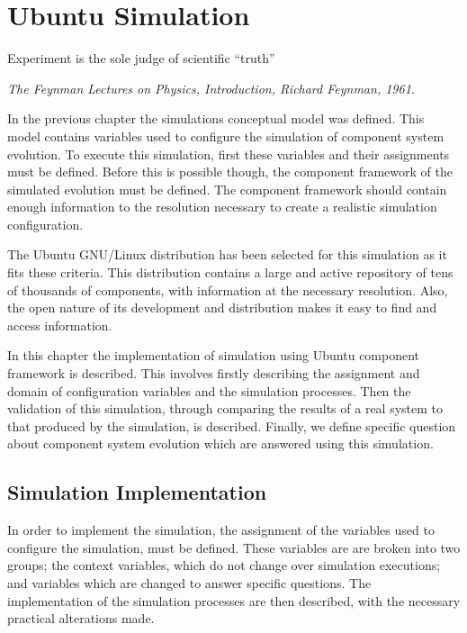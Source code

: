 
\chapter{Ubuntu Simulation}
\label{ubunutsimulation}
\epigraph{Experiment is the sole judge of scientific ``truth''}
{\textit{The Feynman Lectures on Physics, Introduction, Richard Feynman, 1961.}}

In the previous chapter the simulations conceptual model was defined.
This model contains variables used to configure the simulation of component system evolution.
To execute this simulation, first these variables and their assignments must be defined.
Before this is possible though, the component framework of the simulated evolution must be defined.
The component framework should contain enough information to the resolution necessary to create a realistic simulation configuration.

The Ubuntu GNU/Linux distribution has been selected for this simulation as it fits these criteria.
This distribution contains a large and active repository of tens of thousands of components, with information at the necessary resolution.
Also, the open nature of its development and distribution makes it easy to find and access information.

In this chapter the implementation of simulation using Ubuntu component framework is described.
This involves firstly describing the assignment and domain of configuration variables and the simulation processes.
Then the validation of this simulation, through comparing the results of a real system to that produced by the simulation, is described. 
Finally, we define specific question about component system evolution which are answered using this simulation.

\section{Simulation Implementation}
In order to implement the simulation, the assignment of the variables used to configure the simulation, must be defined.
These variables are are broken into two groups; the context variables, which do not change over simulation executions; 
and variables which are changed to answer specific questions.
The implementation of the simulation processes are then described, with the necessary practical alterations made. 

